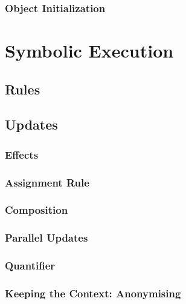 \documentclass[a4paper, 11pt, accentcolor = tud3b]{tudreport}
\begin{document}
				\subsubsection{Object Initialization} %

		\section{Symbolic Execution} %

			\subsection{Rules} %

			\subsection{Updates} %

				\subsubsection{Effects} %

				\subsubsection{Assignment Rule} %

				\subsubsection{Composition} %

				\subsubsection{Parallel Updates} %

				\subsubsection{Quantifier} %

				\subsubsection{Keeping the Context: Anonymising} %
\end{document}
